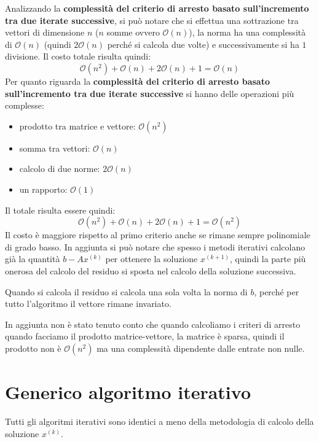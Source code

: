 Analizzando la \textbf{complessità del criterio di arresto basato sull'incremento
    tra due iterate successive}, si può notare che si effettua una sottrazione
tra vettori di dimensione $n$ ($n$ somme ovvero $\mathcal{O}(n)$), la norma ha
una complessità di $\mathcal{O}(n)$ (quindi $2\mathcal{O}(n)$ perché si calcola
due volte) e successivamente si ha $1$ divisione. Il costo totale risulta quindi:
\begin{equation*}
    \mathcal{O}(n^2)+ \mathcal{O}(n)+2\mathcal{O}(n)+1 = \mathcal{O}(n)
\end{equation*}
Per quanto riguarda la \textbf{complessità del criterio di arresto basato
    sull'incremento tra due iterate successive} si hanno delle operazioni più
complesse:
\begin{itemize}
    \item prodotto tra matrice e vettore: $\mathcal{O}(n^2)$
    \item somma tra vettori: $\mathcal{O}(n)$
    \item calcolo di due norme: $2\mathcal{O}(n)$
    \item un rapporto: $\mathcal{O}(1)$
\end{itemize}
Il totale risulta essere quindi:
\begin{equation*}
    \mathcal{O}(n^2)+ \mathcal{O}(n)+2\mathcal{O}(n)+1 = \mathcal{O}(n^2)
\end{equation*}
Il costo è maggiore rispetto al primo criterio anche se rimane sempre polinomiale
di grado basso. In aggiunta si può notare che spesso i metodi iterativi calcolano
già la quantità $b-Ax^{(k)}$ per ottenere la soluzione $x^{(k+1)}$, quindi la parte
più onerosa del calcolo del residuo si sposta nel calcolo della soluzione successiva.
\begin{nota}
    Quando si calcola il residuo si calcola una sola volta la norma di $b$, perché
    per tutto l'algoritmo il vettore rimane invariato.
\end{nota}
\begin{nota}
    In aggiunta non è stato tenuto conto che quando calcoliamo i criteri di arresto
    quando facciamo il prodotto matrice-vettore, la matrice è sparsa, quindi
    il prodotto non è $\mathcal{O}(n^2)$ ma una complessità dipendente dalle entrate
    non nulle.
\end{nota}
\section{Generico algoritmo iterativo}
Tutti gli algoritmi iterativi sono identici a meno della metodologia di calcolo
della soluzione $x^{(k)}$.

